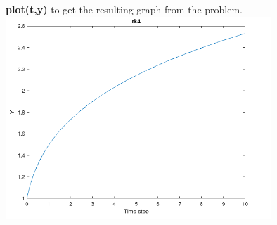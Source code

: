 \documentclass[12pt,letterpaper]{article}
\begin{document}
\textbf{plot(t,y)} to get the resulting graph from the problem.\\
\includegraphics[width=100mm]{rk4}\\
\end{document}
